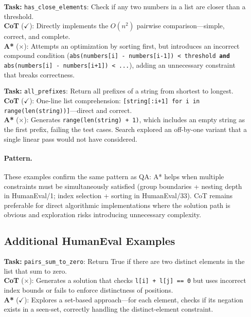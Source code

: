 \documentclass[10pt]{article}
\begin{document}
{\begin{examplebox}[title=HumanEval/0 --- CoT Correct{,} A* Wrong]
\textbf{Task:} \texttt{has\_close\_elements}: Check if any two numbers in a list are closer than a threshold.\\[4pt]
\textbf{CoT} ($\checkmark$): Directly implements the $O(n^2)$ pairwise comparison---simple, correct, and complete.\\[4pt]
\textbf{A*} ($\times$): Attempts an optimization by sorting first, but introduces an incorrect compound condition (\texttt{abs(numbers[i] - numbers[i-1]) < threshold \textbf{and} abs(numbers[i] - numbers[i+1]) < ...}), adding an unnecessary constraint that breaks correctness.
\end{examplebox}

\begin{examplebox}[title=HumanEval/14 --- CoT Correct{,} A* Wrong]
\textbf{Task:} \texttt{all\_prefixes}: Return all prefixes of a string from shortest to longest.\\[4pt]
\textbf{CoT} ($\checkmark$): One-line list comprehension: \texttt{[string[:i+1] for i in range(len(string))]}---direct and correct.\\[4pt]
\textbf{A*} ($\times$): Generates \texttt{range(len(string) + 1)}, which includes an empty string as the first prefix, failing the test cases. Search explored an off-by-one variant that a single linear pass would not have considered.
\end{examplebox}

\paragraph{Pattern.} These examples confirm the same pattern as QA: A* helps when multiple constraints must be simultaneously satisfied (group boundaries + nesting depth in HumanEval/1; index selection + sorting in HumanEval/33). CoT remains preferable for direct algorithmic implementations where the solution path is obvious and exploration risks introducing unnecessary complexity.

\subsection{Additional HumanEval Examples}

\begin{examplebox}[title=HumanEval/43 --- A* Correct{,} CoT Wrong]
\textbf{Task:} \texttt{pairs\_sum\_to\_zero}: Return True if there are two distinct elements in the list that sum to zero.\\[4pt]
\textbf{CoT} ($\times$): Generates a solution that checks \texttt{l[i] + l[j] == 0} but uses incorrect index bounds or fails to enforce distinctness of positions.\\[4pt]
\textbf{A*} ($\checkmark$): Explores a set-based approach---for each element, checks if its negation exists in a seen-set, correctly handling the distinct-element constraint.
\end{examplebox}

}
\end{document}
